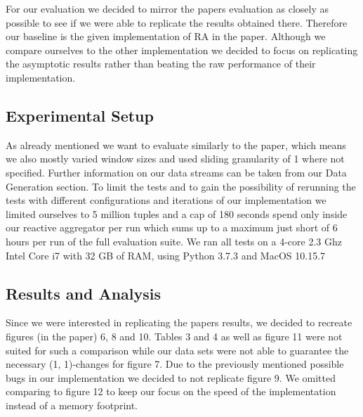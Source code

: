 For our evaluation we decided to mirror the papers evaluation as closely as possible
to see if we were able to replicate the results obtained there.
Therefore our baseline is the given implementation of RA in the paper.
Although we compare ourselves to the other implementation we decided to focus on
replicating the asymptotic results rather than beating the raw performance of their implementation.

\subsection{Experimental Setup}
As already mentioned we want to evaluate similarly to the paper, which means we also mostly varied
window sizes and used sliding granularity of 1 where not specified.
Further information on our data streams can be taken from our Data Generation section. %
To limit the tests and to gain the possibility of rerunning the tests with different configurations
and iterations of our implementation we limited ourselves to 5 million tuples and
a cap of 180 seconds spend only inside our reactive aggregator per run
which sums up to a maximum just short of 6 hours per run of the full evaluation suite.
We ran all tests on a 4-core 2.3 Ghz Intel Core i7 with 32 GB of RAM, using
Python 3.7.3 and MacOS 10.15.7

\subsection{Results and Analysis}
Since we were interested in replicating the papers results, we decided to
recreate figures (in the paper) 6, 8 and 10. Tables 3 and 4 as well as figure 11 were not suited
for such a comparison while our data sets were not able to guarantee the necessary
(1, 1)-changes for figure 7. Due to the previously mentioned possible bugs in our
implementation we decided to not replicate figure 9. We omitted comparing to figure 12
to keep our focus on the speed of the implementation instead of a memory footprint.
